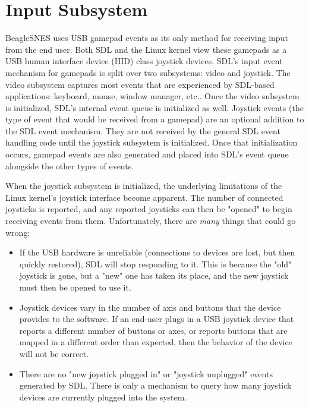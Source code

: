 \section{Input Subsystem}

BeagleSNES uses USB gamepad events as its only method for receiving input from the end user.  Both SDL and the Linux kernel view these gamepads as a USB human interface device (HID) class joystick devices.  SDL's input event mechanism for gamepads is split over two subsystems: video and joystick.  The video subsystem captures most events that are experienced by SDL-based applications: keyboard, mouse, window manager, etc..  Once the video subsystem is initialized, SDL's internal event queue is initialized as well.  Joystick events (the type of event that would be received from a gamepad) are an optional addition to the SDL event mechanism.  They are not received by the general SDL event handling code until the joystick subsystem is initialized.  Once that initialization occurs, gamepad events are also generated and placed into SDL's event queue alongside the other types of events.  

When the joystick subsystem is initialized, the underlying limitations of the Linux kernel's joystick interface become apparent.  The number of connected joysticks is reported, and any reported joysticks can then be "opened" to begin receiving events from them.  Unfortunately, there are \emph{many} things that could go wrong:

\begin{itemize}
\item If the USB hardware is unreliable (connections to devices are lost, but then quickly restored), SDL will stop responding to it.  This is because the "old" joystick is gone, but a "new" one has taken its place, and the new joystick must then be opened to use it.  
\item Joystick devices vary in the number of axis and buttons that the device provides to the software.  If an end-user plugs in a USB joystick device that reports a different number of buttons or axes, or reports buttons that are mapped in a different order than expected, then the behavior of the device will not be correct.
\item There are no "new joystick plugged in" or "joystick unplugged" events generated by SDL. There is only a mechanism to query how many joystick devices are currently plugged into the system.
\end{itemize}
 
